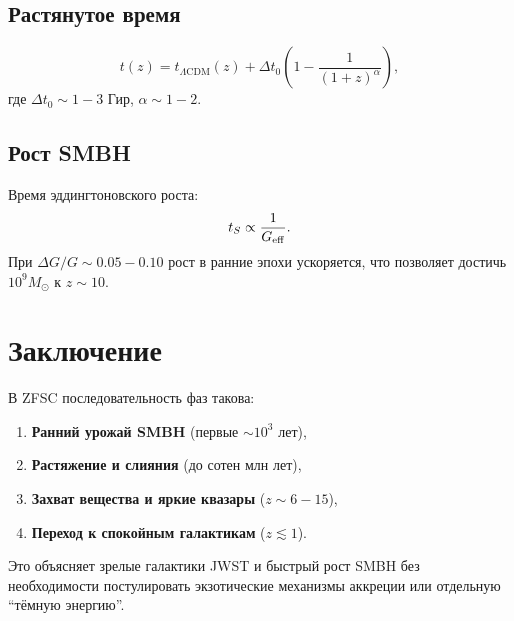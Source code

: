 \documentclass[12pt,a4paper]{article}
\begin{document}
\subsection{Растянутое время}
\[
t(z)=t_{\Lambda \text{CDM}}(z)+\Delta t_0 \left(1-\frac{1}{(1+z)^\alpha}\right),
\]
где $\Delta t_0 \sim 1-3$ Гир, $\alpha \sim 1-2$.

\subsection{Рост SMBH}
Время эддингтоновского роста:
\[
t_S \propto \frac{1}{G_{\rm eff}}.
\]
При $\Delta G/G \sim 0.05-0.10$ рост в ранние эпохи ускоряется, что позволяет достичь $10^9 M_\odot$ к $z\sim 10$.

\section{Заключение}
В ZFSC последовательность фаз такова:
\begin{enumerate}
  \item \textbf{Ранний урожай SMBH} (первые $\sim 10^3$ лет),
  \item \textbf{Растяжение и слияния} (до сотен млн лет),
  \item \textbf{Захват вещества и яркие квазары} ($z\sim 6-15$),
  \item \textbf{Переход к спокойным галактикам} ($z\lesssim 1$).
\end{enumerate}

Это объясняет зрелые галактики JWST и быстрый рост SMBH без необходимости постулировать экзотические механизмы аккреции или отдельную ``тёмную энергию''.
\end{document}
